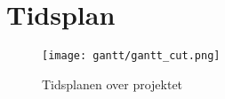 \chapter{Tidsplan} \label{bilag:tidsplan}

\begin{figure}[h!]
	\centering
	\texttt{[image: gantt/gantt\_cut.png]}
	\caption{Tidsplanen over projektet}
	\label{fig:tidsplan}
\end{figure}
